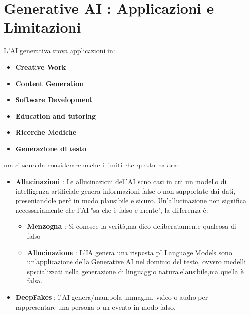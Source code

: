 \section{Generative AI : Applicazioni e Limitazioni}
L'AI generativa trova applicazioni in:
\begin{itemize}
    \item \textbf{Creative Work}
    \item \textbf{Content Generation}
    \item \textbf{Software Development}
    \item \textbf{Education and tutoring}
    \item \textbf{Ricerche Mediche}
    \item \textbf{Generazione di testo}
\end{itemize}
ma ci sono da considerare anche i limiti che questa ha ora:
\begin{itemize}
    \item \textbf{Allucinazioni} : Le allucinazioni dell'AI sono casi in cui un modello di intelligenza artificiale genera informazioni 
    false o non supportate dai dati, presentandole però in modo plausibile e sicuro.
    Un'allucinazione non significa necessariamente che l'AI "sa che è falso e mente", la differenza è:
    \begin{itemize}
        \item \textbf{Menzogna} : Si conosce la verità,ma dico deliberatamente qualcosa di falso
        \item \textbf{Allucinazione} : L'IA genera una risposta pI Language Models sono un'applicazione della Generative AI nel dominio del testo, ovvero modelli specializzati nella generazione di linguaggio naturalelausibile,ma quella è falsa.
    \end{itemize}
    \item \textbf{DeepFakes} : l'AI genera/manipola immagini, video o audio per rappresentare una persona o un evento in modo falso.
\end{itemize}
